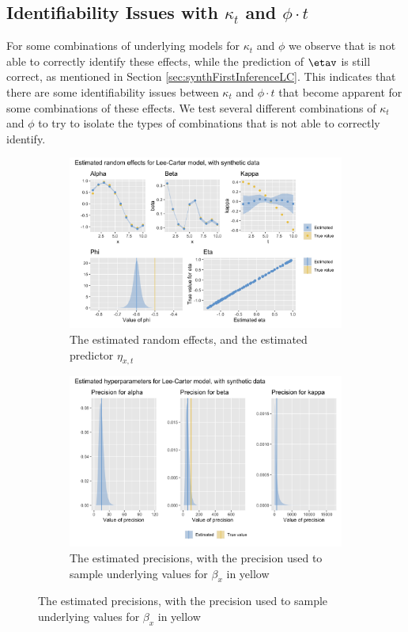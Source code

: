 \subsection{Identifiability Issues with $\kappa_t$ and $\phi\cdot t$}
\label{sec:IdentifiabilityKappa}
For some combinations of underlying models for $\kappa_t$ and $\phi$ we observe that \inlabru is not able to correctly identify these effects, while the prediction of $\etav$ is still correct, as mentioned in Section \ref{sec:synthFirstInferenceLC}. This indicates that there are some identifiability issues between $\kappa_t$ and $\phi \cdot t$ that become apparent for some combinations of these effects. We test several different combinations of $\kappa_t$ and $\phi$ to try to isolate the types of combinations that \inlabru is not able to correctly identify.
\begin{figure}[h!]
    \centering
    \begin{subfigure}[b]{0.6\textwidth}
        \includegraphics[width=\textwidth]{synthetic-data/Figures/effects-LC-synthetic-identifiability.png}
        \caption{The estimated random effects, and the estimated predictor $\eta_{x,t}$}
        \label{fig:unidentifiabilityKappa-top}
    \end{subfigure}
    
    \begin{subfigure}[b]{0.6\textwidth}
        \includegraphics[width=\textwidth]{synthetic-data/Figures/hyperparameters-LC-synthetic-2-2.png}
        \caption{The estimated precisions, with the precision used to sample underlying values for $\beta_x$ in yellow}
        \label{fig:unidentifiabilityKappa-top}
    \end{subfigure}
    

\end{figure}
